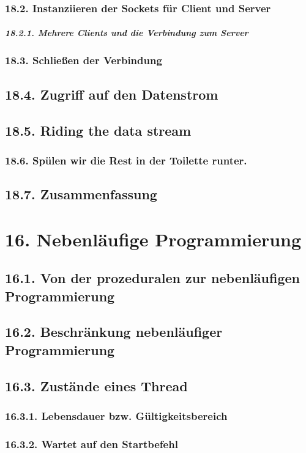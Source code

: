 \subsection{18.2.	Instanziieren der Sockets für Client und Server}
\paragraph{18.2.1.	Mehrere Clients und die Verbindung zum Server}
\subsection{18.3.	Schließen der Verbindung}
\section{18.4.	Zugriff auf den Datenstrom}
\section{18.5.	Riding the data stream}
\subsection{18.6.	Spülen wir die Rest in der Toilette runter.}
\section{18.7.	Zusammenfassung}

\chapter{16.	Nebenläufige Programmierung}
\section{16.1.	Von der prozeduralen zur nebenläufigen Programmierung}
\section{16.2.	Beschränkung nebenläufiger Programmierung}
\section{16.3.	Zustände eines Thread}
\subsection{16.3.1.	Lebensdauer bzw. Gültigkeitsbereich}
\subsection{16.3.2.	Wartet auf den Startbefehl}
